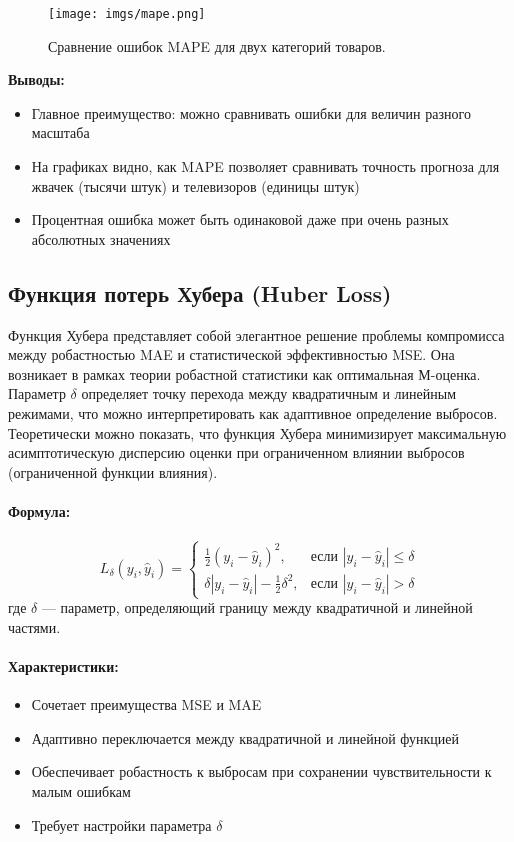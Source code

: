 \begin{figure}[h!]
    \centering
    \texttt{[image: imgs/mape.png]}
    \caption{Сравнение ошибок MAPE для двух категорий товаров.}
    \label{fig:mape_graph}
\end{figure}

\noindent\textbf{Выводы:}
\begin{itemize}
    \item Главное преимущество: можно сравнивать ошибки для величин разного масштаба
    \item На графиках видно, как MAPE позволяет сравнивать точность прогноза для жвачек (тысячи штук) и телевизоров (единицы штук)
    \item Процентная ошибка может быть одинаковой даже при очень разных абсолютных значениях
\end{itemize}


\subsection{Функция потерь Хубера (Huber Loss)}

Функция Хубера представляет собой элегантное решение проблемы компромисса между робастностью MAE и статистической эффективностью MSE. Она возникает в рамках теории робастной статистики как оптимальная М-оценка. Параметр $\delta$ определяет точку перехода между квадратичным и линейным режимами, что можно интерпретировать как адаптивное определение выбросов. Теоретически можно показать, что функция Хубера минимизирует максимальную асимптотическую дисперсию оценки при ограниченном влиянии выбросов (ограниченной функции влияния).

\paragraph{Формула:}
\[
L_\delta(y_i, \hat{y}_i) = 
\begin{cases} 
\frac{1}{2} (y_i - \hat{y}_i)^2, & \text{если } |y_i - \hat{y}_i| \leq \delta \\
\delta |y_i - \hat{y}_i| - \frac{1}{2} \delta^2, & \text{если } |y_i - \hat{y}_i| > \delta
\end{cases}
\]
где $\delta$ — параметр, определяющий границу между квадратичной и линейной частями.

\paragraph{Характеристики:}
\begin{itemize}
    \item Сочетает преимущества MSE и MAE
    \item Адаптивно переключается между квадратичной и линейной функцией
    \item Обеспечивает робастность к выбросам при сохранении чувствительности к малым ошибкам
    \item Требует настройки параметра $\delta$
\end{itemize}

